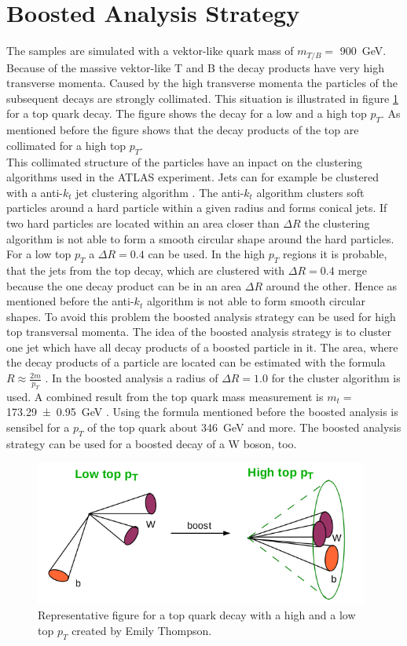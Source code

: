 \section{Boosted Analysis Strategy}
The samples are simulated with a vektor-like quark mass of $m_{T/B} =$ \SI{900}{GeV}. 
Because of the massive vektor-like T and B the decay products have very high transverse momenta. 
Caused by the high transverse momenta the particles of the subsequent decays are strongly collimated. 
This situation is illustrated in figure \ref{boosted} for a top quark decay.
The figure shows the decay for a low and a high top $p_{T}$.
As mentioned before the figure shows that the decay products of the top are collimated for a high top $p_{T}$.\\
This collimated structure of the particles have an inpact on the clustering algorithms used in the ATLAS experiment.
Jets can for example be clustered with a anti-$k_{t}$ jet clustering algorithm \cite{antikt}.  
The anti-$k_{t}$ algorithm clusters soft particles around a hard particle within a given radius and forms conical jets. 
If two hard particles are located within an area closer than $\Delta R$ the clustering algorithm is not able to form a smooth circular shape around the hard particles.  
For a low top $p_{T}$ a $\Delta R = 0.4$ can be used.
In the high $p_{T}$ regions it is probable, that the jets from the top decay, which are clustered with $\Delta R = 0.4$  merge because the one decay product can be in an area $\Delta R$ around the other. 
Hence as mentioned before the anti-$k_{t}$ algorithm is not able to form smooth circular shapes. 
To avoid this problem the boosted analysis strategy can be used for high top transversal momenta.
The idea of the boosted analysis strategy is to cluster one jet which have all decay products of a boosted particle in it.
The area, where the decay products of a particle are located can be estimated with the formula $R \approx \frac{2m}{p_{T}}$ .
In the boosted analysis a radius of $\Delta R = 1.0$ for the cluster algorithm is used. 
A combined result from the top quark mass measurement is $m_{t} =$ \SI{173.29 \pm 0.95}{GeV} \cite{topmass}.
Using the formula mentioned before the boosted analysis is sensibel for a $p_{T}$ of the top quark about \SI{346}{GeV} and more. 
The boosted analysis strategy can be used for a boosted decay of a W boson, too.

\begin{figure}
\centering
\includegraphics[width=11cm]{figures/boost.png}
\caption{Representative figure for a top quark decay with a high and a low top $p_{T}$ created by Emily Thompson.}
\label{boosted}
\end{figure}

